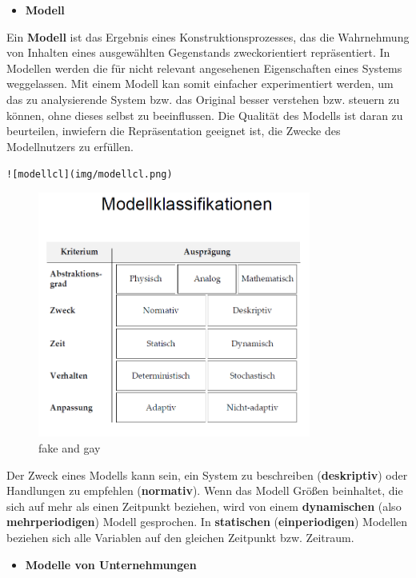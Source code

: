 \documentclass[]{article}
\providecommand{\tightlist}{%
  \setlength{\itemsep}{0pt}\setlength{\parskip}{0pt}}
\begin{document}
\begin{itemize}
\tightlist
\item
  \textbf{Modell}
\end{itemize}

Ein \textbf{Modell} ist das Ergebnis eines Konstruktionsprozesses, das
die Wahrnehmung von Inhalten eines ausgewählten Gegenstands
zweckorientiert repräsentiert. In Modellen werden die für nicht relevant
angesehenen Eigenschaften eines Systems weggelassen. Mit einem Modell
kan somit einfacher experimentiert werden, um das zu analysierende
System bzw. das Original besser verstehen bzw. steuern zu können, ohne
dieses selbst zu beeinflussen. Die Qualität des Modells ist daran zu
beurteilen, inwiefern die Repräsentation geeignet ist, die Zwecke des
Modellnutzers zu erfüllen.

\texttt{!{[}modellcl{]}(img/modellcl.png)}

\begin{figure}
\centerline{\includegraphics[width=0.8\textwidth]{img/modellcl.png}}
\caption{fake and gay}
\end{figure}

Der Zweck eines Modells kann sein, ein System zu beschreiben
(\textbf{deskriptiv}) oder Handlungen zu empfehlen (\textbf{normativ}).
Wenn das Modell Größen beinhaltet, die sich auf mehr als einen Zeitpunkt
beziehen, wird von einem \textbf{dynamischen} (also
\textbf{mehrperiodigen}) Modell gesprochen. In \textbf{statischen}
(\textbf{einperiodigen}) Modellen beziehen sich alle Variablen auf den
gleichen Zeitpunkt bzw. Zeitraum.

\begin{itemize}
\tightlist
\item
  \textbf{Modelle von Unternehmungen}
\end{itemize}
\end{document}
